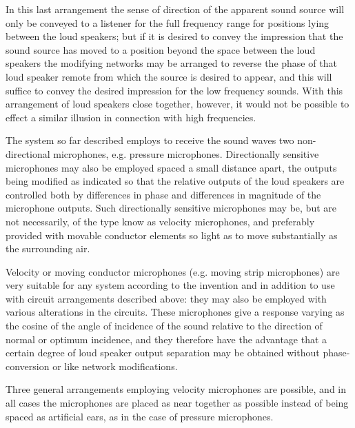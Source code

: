 \documentclass[11pt]{article}
\begin{document}
\begin{multicols*}{2}
In this last arrangement the sense of direction of the apparent sound source will only be conveyed to a listener for the full frequency range for positions lying between the loud speakers; but if it is desired to convey the impression that the sound source has moved to a position beyond the space between the loud speakers the modifying networks may be arranged to reverse the phase of that loud speaker remote from which the source is desired to appear, and this will suffice to convey the desired impression for the low frequency sounds. With this arrangement of loud speakers close together, however, it would not be possible to effect a similar illusion in connection with high frequencies.

The system so far described employs to receive the sound waves two non-directional microphones, e.g. pressure microphones. Directionally sensitive microphones may also be employed spaced a small distance apart, the outputs being modified as indicated so that the relative outputs of the loud speakers are controlled both by differences in phase and differences in magnitude of the microphone outputs. Such directionally sensitive microphones may be, but are not necessarily, of the type know as velocity microphones, and preferably provided with movable conductor elements so light as to move substantially as the surrounding air.

Velocity or moving conductor microphones (e.g. moving strip microphones) are very suitable for any system according to the invention and in addition to use with circuit arrangements described above: they may also be employed with various alterations in the circuits. These microphones give a response varying as the cosine of the angle of incidence of the sound relative to the direction of normal or optimum incidence, and they therefore have the advantage that a certain degree of loud speaker output separation may be obtained without phase-conversion or like network modifications.

Three general arrangements employing velocity microphones are possible, and in all cases the microphones are placed as near together as possible instead of being spaced as artificial ears, as in the case of pressure microphones.


\end{multicols*}
\end{document}
